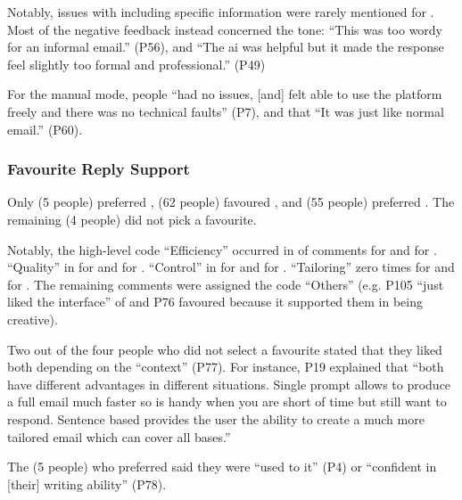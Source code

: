 Notably, issues with including specific information were rarely mentioned for \modeours.
Most of the negative feedback instead concerned the tone: ``This was too wordy for an informal email.'' (P56), %
and ``The ai was helpful but it made the response feel slightly too formal and professional.'' (P49) %

For the manual mode, people ``had no issues, [and] felt able to use the platform freely and there was no technical faults'' (P7), and that ``It was just like normal email.'' (P60). %


\subsubsection{Favourite Reply Support}\label{sec:results_fav_mode}
Only  (5 people) preferred \modemanual, %
 (62 people) favoured \modemail, and  (55 people) preferred \modeours.
The remaining  (4 people) did not pick a favourite.

Notably, the high-level code ``Efficiency'' occurred in  of comments for \modemail{} and  for \modeours{}.
``Quality'' in  for \modemail{} and  for \modeours{}.
``Control'' in  for \modemail{} and  for \modeours{}.
``Tailoring'' zero times for \modemail{} and  for \modeours{}.
The remaining comments were assigned the code ``Others'' (e.g. P105 ``just liked the interface'' of \modemail{} and P76 favoured \modeours{} because it supported them in being creative).

Two out of the four people who did not select a favourite stated that they liked both depending on the ``context'' (P77).
For instance, P19 explained that ``both have different advantages in different situations. Single prompt allows to produce a full email much faster so is handy when you are short of time but still want to respond. Sentence based provides the user the ability to create a much more tailored email which can cover all bases.''

The  (5 people) who preferred \modemanual{} said they were ``used to it'' (P4) or ``confident in [their] writing ability'' (P78).
















